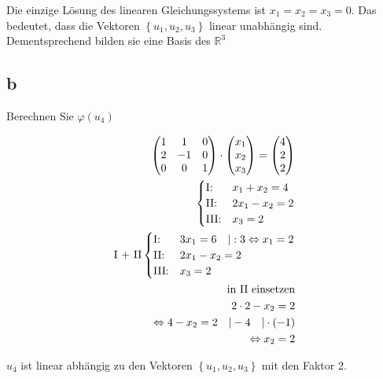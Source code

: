 Die einzige Lösung des linearen Gleichungssystems ist $x_1 = x_2 = x_3 = 0$. Das bedeutet, 
dass die Vektoren $\left\{u_1, u_2, u_3\right\}$ linear unabhängig sind. Dementsprechend bilden sie 
eine Basis des $\mathbb{R}^3$

\subsection{b}
Berechnen Sie $\varphi(u_4)$

\begin{align*}
    \begin{pmatrix}
        1 & 1 & 0 \\ 2 & -1 & 0 \\ 0 & 0 & 1
    \end{pmatrix} \cdot \begin{pmatrix}
        x_1 \\ x_2 \\ x_3
    \end{pmatrix} = \begin{pmatrix}
        4 \\ 2 \\ 2
    \end{pmatrix} \\
    \begin{cases}
        \text{I:\@} & x_1 + x_2 = 4\\
        \text{II:\@} & 2x_1 - x_2 = 2\\
        \text{III:\@} & x_3 = 2
    \end{cases} \\
    \text{I + II}
    \begin{cases}
        \text{I:\@} & 3x_1 = 6 \quad | :3 \Leftrightarrow x_1 = 2 \\
        \text{II:\@} & 2x_1 - x_2 = 2\\
        \text{III:\@} & x_3 = 2
    \end{cases} \\
    \text{in II einsetzen} \\
    2 \cdot 2 - x_2 = 2 \\
    \Leftrightarrow 4 - x_2 = 2 \quad | -4 \quad | \cdot(-1) \\
    \Leftrightarrow x_2 = 2
\end{align*}

$u_4$ ist linear abhängig zu den Vektoren $\left\{u_1, u_2, u_3\right\}$ mit den Faktor 2.

